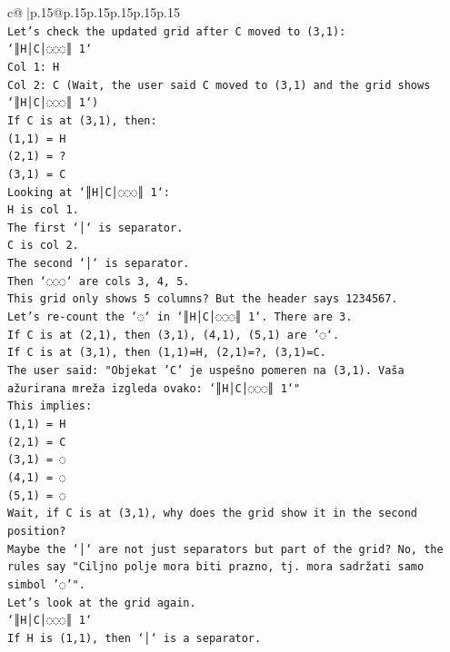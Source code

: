 \documentclass{article}
\begin{document}
{\begin{supertabular}{c@{$\;$}|p{.15\linewidth}@{}p{.15\linewidth}p{.15\linewidth}p{.15\linewidth}p{.15\linewidth}p{.15\linewidth}}
{{{\\ 
\texttt{Let's check the updated grid after C moved to (3,1):} \\
\texttt{`║H│C│◌◌◌║ 1`} \\
\texttt{Col 1: H} \\
\texttt{Col 2: C (Wait, the user said C moved to (3,1) and the grid shows `║H│C│◌◌◌║ 1`)} \\
\texttt{If C is at (3,1), then:} \\
\texttt{(1,1) = H} \\
\texttt{(2,1) = ?} \\
\texttt{(3,1) = C} \\
\texttt{Looking at `║H│C│◌◌◌║ 1`:} \\
\texttt{H is col 1.} \\
\texttt{The first `│` is separator.} \\
\texttt{C is col 2.} \\
\texttt{The second `│` is separator.} \\
\texttt{Then `◌◌◌` are cols 3, 4, 5.} \\
\texttt{This grid only shows 5 columns? But the header says 1234567.} \\
\texttt{Let's re{-}count the `◌` in `║H│C│◌◌◌║ 1`. There are 3.} \\
\texttt{If C is at (2,1), then (3,1), (4,1), (5,1) are `◌`.} \\
\texttt{If C is at (3,1), then (1,1)=H, (2,1)=?, (3,1)=C.} \\
\texttt{The user said: "Objekat 'C' je uspešno pomeren na (3,1). Vaša ažurirana mreža izgleda ovako: `║H│C│◌◌◌║ 1`"} \\
\texttt{This implies:} \\
\texttt{(1,1) = H} \\
\texttt{(2,1) = C} \\
\texttt{(3,1) = ◌} \\
\texttt{(4,1) = ◌} \\
\texttt{(5,1) = ◌} \\
\texttt{Wait, if C is at (3,1), why does the grid show it in the second position?} \\
\texttt{Maybe the `│` are not just separators but part of the grid? No, the rules say "Ciljno polje mora biti prazno, tj. mora sadržati samo simbol '◌'".} \\
\texttt{Let's look at the grid again.} \\
\texttt{`║H│C│◌◌◌║ 1`} \\
\texttt{If H is (1,1), then `│` is a separator.} \\
}}}
\end{supertabular}}
\end{document}
